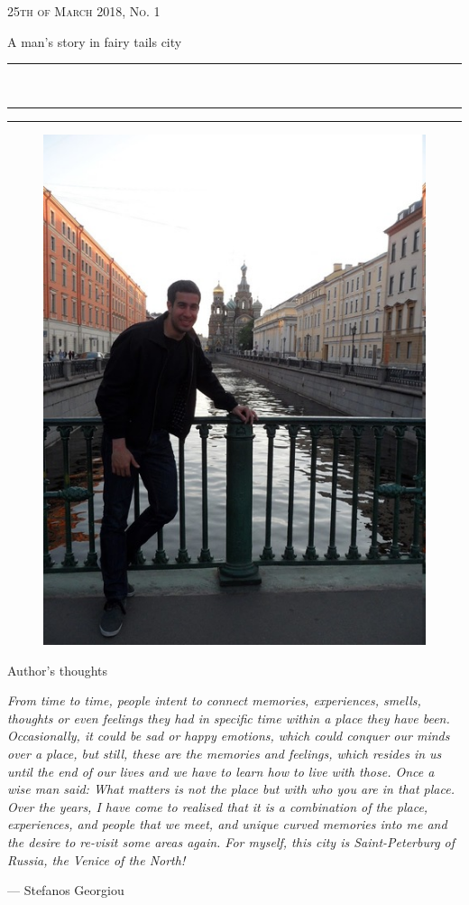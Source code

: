 \documentclass[10pt,a4paper]{article} %
\newcommand{\HorRule}[1]{\noindent\rule{\linewidth}{#1}} %
\newcommand{\SepRule}{\noindent	%
\begin{center}
\rule{250pt}{1pt} %
\end{center}
}
\newcommand{\NewsletterName}[1]{ %
\begin{center}
\Huge \usefont{T1}{fvs}{b}{n} %
#1
\end{center}	
\par \normalsize \normalfont}
\newcommand{\JournalIssue}[1]{ %
\hfill \textsc{25th of March 2018, No. #1} %
\par \normalsize \normalfont}
\newcommand{\NewsItem}[1]{ %
\usefont{T1}{fvs}{n}{n} %
\vspace{24pt}\large #1\vspace{3pt} %
\par \normalsize \normalfont}
\begin{document}
\JournalIssue{1} %

\NewsletterName{A man's story in fairy tails city} %

\noindent\HorRule{3pt} \\[-0.75\baselineskip] %
\HorRule{1pt} %


\vspace{0.5cm}
\SepRule
\vspace{-0.5cm}

\begin{center}
\begin{minipage}[h]{0.75 \linewidth}
\begin{figure}
\includegraphics[width=0.38 \textwidth]{media/front_picture.jpg} \\
\end{figure}
	
\NewsItem{Author's thoughts} %
\vspace{3pt} %
\textit{
From time to time, people intent to connect memories, experiences, smells,
thoughts or even feelings they had in specific time within a place they have been.
Occasionally, it could be sad or happy emotions,
which could conquer our minds over a place,
but still, these are the memories and feelings,
which resides in us until the end of our lives
and we have to learn how to live with those.
Once a wise man said:
What matters is not the place but with who you are in that place.
Over the years, I have come to realised that it is a combination of the place,
experiences, and people that we meet, and unique curved memories into me
and the desire to re-visit some areas again.
For myself, this city is Saint-Peterburg of Russia, the Venice of the North!
}
\par\hfill --- Stefanos Georgiou
\end{minipage}
\end{center}
\end{document}
